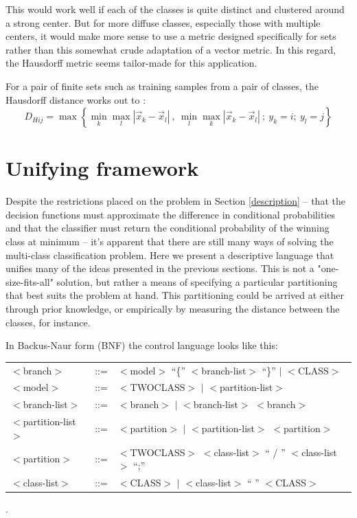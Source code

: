 \documentclass{article}
\begin{document}
This would work well if each of the classes is quite distinct and clustered around a strong center.
But for more diffuse classes, especially those with multiple centers, it would make more sense to use a metric designed specifically for sets rather than this somewhat crude adaptation of a vector metric.
In this regard, the Hausdorff metric seems tailor-made for this application.

For a pair of finite sets such as training samples from a pair of classes,
the Hausdorff distance works out to \citep{Ott1993, Gulick1992}:
\begin{equation}
D_{Hij} = \max \left \lbrace \min_k \max_l | \vec x_k - \vec x_l|~,~\min_l \max_k | \vec x_k - \vec x_l| ~ ;~y_k=i;~y_l=j \right \rbrace
\end{equation}

\section{Unifying framework}

Despite the restrictions placed on the problem in Section \ref{description}
-- that the decision functions must approximate the difference in conditional
probabilities and that the classifier must return the conditional probability
of the winning class at minimum -- it's apparent that there are still many ways
of solving the multi-class classification problem.
Here we present a descriptive language that unifies many of the ideas presented
in the previous sections.
This is not a "one-size-fits-all" solution, but rather a means of specifying
a particular partitioning that best suits the problem at hand.
This partitioning could be arrived at either through prior knowledge, 
or empirically by measuring the distance between the classes, for instance.

In Backus-Naur form (BNF) the control language looks like this:

\begin{tabular}{lcl}
$<$branch$>$ & ::= & $<$model$>$ ``\{'' $<$branch-list$>$ ``\}'' $|$ $<$CLASS$>$\\
$<$model$>$  & ::= & $<$TWOCLASS$>$ $|$ $<$partition-list$>$\\
$<$branch-list$>$ & ::= & $<$branch$>$ $|$ $<$branch-list$>$ $<$branch$>$\\
$<$partition-list$>$ & ::= & $<$partition$>$ $|$ $<$partition-list$>$ $<$partition$>$\\
$<$partition$>$ & ::= & $<$TWOCLASS$>$ $<$class-list$>$ `` / '' $<$class-list$>$ ``;''\\
$<$class-list$>$ & ::= & $<$CLASS$>$ $|$ $<$class-list$>$ `` '' $<$CLASS$>$
\end{tabular}.
\end{document}
